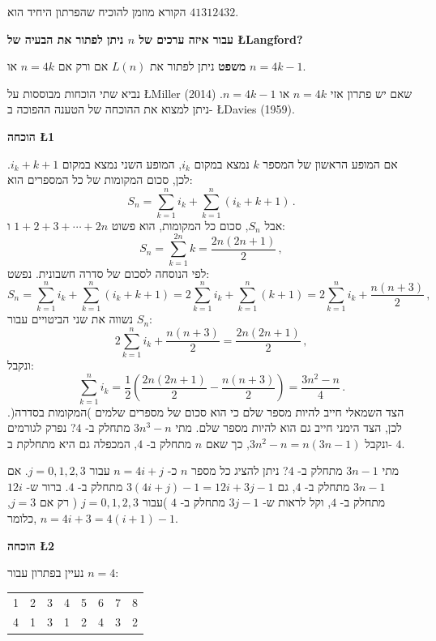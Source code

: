 \documentclass[12pt,a4paper]{article}
\begin{document}
הקורא מוזמן להוכיח שהפרתון היחיד הוא
$41312432$.

\newpage

\begin{center}
\textbf{\Large
עבור איזה ערכים של
$n$
ניתן לפתור את הבעיה של
\L{Langford}?}
\end{center}

\textbf{משפט}
ניתן לפתור את
$L(n)$
אם ורק אם
$n=4k$
או
$n=4k-1$.

נביא שתי הוכחות מבוססות על
\L{Miller (2014)}
שאם יש פתרון אזי $n=4k$
או
$n=4k-1$.
ניתן למצוא את ההוכחה של הטענה ההפוכה ב-
\L{Davies (1959)}.

\bigskip

\textbf{הוכחה
\L{1}}



אם המופע הראשון של המספר
$k$
נמצא במקום
$i_k$,
המופע השני נמצא במקום
$i_k+k+1$.
לכן, סכום המקומות של כל המספרים הוא:
\[
S_n=\sum_{k=1}^{n}i_k+\sum_{k=1}^{n}(i_k+k+1)\,.
\]
אבל
$S_n$,
סכום כל המקומות, הוא פשוט
$1+2+3+\cdots+2n$
ו:
\[
S_n=\sum_{k=1}^{2n}k = \frac{2n(2n+1)}{2}\,,
\]
לפי הנוסחה לסכום של סדרה חשבונית. נפשט:
\[
S_n=\sum_{k=1}^{n}i_k+\sum_{k=1}^{n}(i_k+k+1) = 2\sum_{k=1}^{n}i_k+\sum_{k=1}^{n}(k+1) = 2\sum_{k=1}^{n}i_k+\frac{n(n+3)}{2}\,,
\]
נשווה את שני הביטויים עבור
$S_n$:
\[
2\sum_{k=1}^{n}i_k+\frac{n(n+3)}{2} = \frac{2n(2n+1)}{2}\,,
\]
ונקבל:
\[
\sum_{k=1}^{n}i_k = \frac{1}{2}\left(\frac{2n(2n+1)}{2} - \frac{n(n+3)}{2}\right) = \frac{3n^2-n}{4}\,.
\]
הצד השמאלי חייב להיות מספר שלם כי הוא סכום של מספרים שלמים )המקומות בסדרה(. לכן, הצד הימני חייב גם הוא להיות מספר שלם. מתי 
$3n^3-n$
מתחלק ב-%
$4$?
נפרק לגורמים ונקבל
$3n^2-n=n(3n-1)$,
כך שאם 
$n$
מתחלק ב-%
$4$,
המכפלה גם היא מתחלקת ב-%
$4$.

מתי 
$3n-1$
מתחלק ב-%
$4$?
ניתן להציג כל מספר
$n$
כ-%
$n=4i+j$
עבור
$j=0,1,2,3$.
אם 
$3n-1$
מתחלק ב-%
$4$,
גם
$3(4i+j)-1 = 12i+3j-1$
מתחלק ב-%
$4$.
ברור ש-%
$12i$
מתחלק ב-%
$4$,
וקל לראות ש-%
$3j-1$
מתחלק ב-%
$4$
)עבור 
$j=0,1,2,3$%
( רק אם
$j=3$, 
כלומר,
$n=4i+3=4(i+1)-1$.



\newpage

\textbf{הוכחה
\L{2}}


נעיין בפתרון עבור
$n=4$:

\begin{center}
\begin{tabular}{cccccccc}
1&2&3&4&5&6&7&8\\
4&1&3&1&2&4&3&2
\end{tabular}
\end{center}
\end{document}

